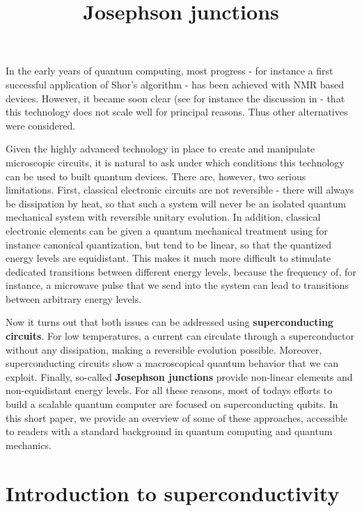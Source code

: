 \documentclass[a4paper, draft]{article}
\title{Josephson junctions}
\theoremstyle{own}
\theoremstyle{remark}
\begin{document}
\maketitle


In the early years of quantum computing, most progress - for instance a first successful application of Shor's algorithm - has been achieved with NMR based devices. However, it became soon clear (see for instance the discussion in \cite{WarrenEtAl} - that this technology does not scale well for principal reasons. Thus other alternatives were considered.

Given the highly advanced technology in place to create and manipulate microscopic circuits, it is natural to ask under which conditions this technology can be used to built quantum devices. There are, however, two serious limitations. First, classical electronic circuits are not reversible - there will always be dissipation by heat, so that such a system will never be an isolated quantum mechanical system with reversible unitary evolution. In addition, classical electronic elements can be given a quantum mechanical treatment using for instance canonical quantization, but tend to be linear, so that the quantized energy levels are equidistant. This makes it much more difficult to stimulate dedicated transitions between different energy levels, because the frequency of, for instance, a microwave pulse that we send into the system can lead to transitions between arbitrary energy levels.

Now it turns out that both issues can be addressed using {\bf superconducting circuits}. For low temperatures, a current can circulate through a superconductor without any dissipation, making a reversible evolution possible. Moreover, superconducting circuits show a macroscopical quantum behavior that we can exploit. Finally, so-called {\bf Josephson junctions} provide non-linear elements and non-equidistant energy levels. For all these reasons, most of todays efforts to build a scalable quantum computer are focused on superconducting qubits. In this short paper, we provide an overview of some of these approaches, accessible to readers with a standard background in quantum computing and quantum mechanics.

\section{Introduction to superconductivity}
\end{document}
